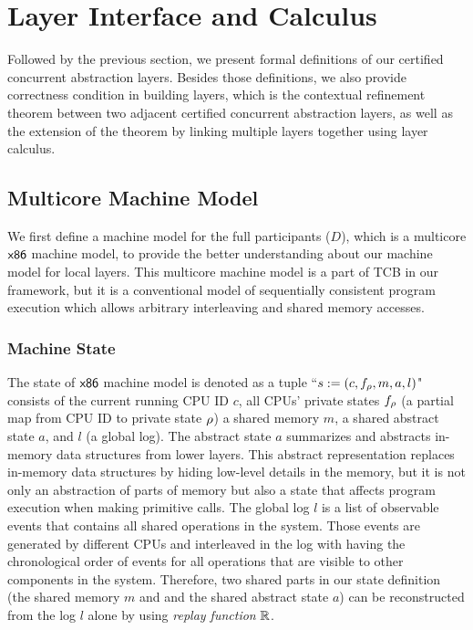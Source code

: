 \section{Layer Interface and Calculus}
\label{chapter:ccal:sec:interface-calculus}

Followed by the previous section, 
we present formal definitions of our certified concurrent abstraction layers.
Besides those definitions, 
we also provide correctness condition in building layers, which is 
the contextual refinement theorem between two adjacent certified concurrent abstraction layers,
as well as the extension of the theorem by linking multiple layers together using layer calculus.


\subsection{Multicore Machine Model}
\label{capther:ccal:subsec:multicore-machine-model}

We first define a machine model for the full participants ($D$), which is a multicore $\mathsf{x86}$ machine model, 
to provide the better understanding about our machine model for local layers.
This multicore machine model is a part of TCB in our framework, but 
it  is a conventional  model of sequentially consistent program
execution which allows arbitrary interleaving
and shared memory
accesses. 

\subsubsection{Machine State} 
The state of  $\mathsf{x86}$ machine model is denoted as a tuple ``$s := (c, f_{\rho}, m, a, l)$"
consists of
 the current running CPU ID $c$,
all CPUs' private states $f_\rho$ (a partial map from CPU ID to  private state $\rho$)
 a shared memory $m$,
 a shared abstract state $a$,
and  $l$ (a global log).
The abstract state $a$ 
summarizes and abstracts in-memory data structures from lower layers. 
This abstract representation replaces
in-memory data structures by hiding low-level details in the memory,
but it is not only an abstraction of parts of memory but also a state that affects program execution when making primitive calls. 
The global log $l$ is a list of observable events that contains all shared operations in the system.
Those events are generated by different CPUs and
interleaved in the log with having the  chronological order of events for all operations that are visible to other components in the system. 
Therefore,
two shared parts in our state definition (the shared memory $m$ and 
and the shared abstract state $a$)
can be reconstructed
from the log $l$ alone by using \emph{replay function} $\mathbb{R}$.





